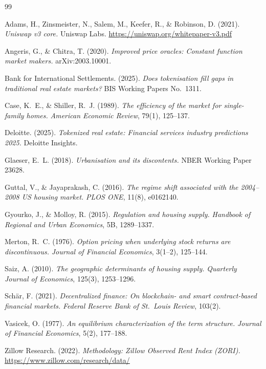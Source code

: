 \documentclass[11pt,letterpaper]{article}
\begin{document}
\begin{thebibliography}{99}

Adams, H., Zinsmeister, N., Salem, M., Keefer, R., \& Robinson, D. (2021).
\textit{Uniswap v3 core.}
Uniswap Labs.
\url{https://uniswap.org/whitepaper-v3.pdf}

Angeris, G., \& Chitra, T. (2020).
\textit{Improved price oracles: Constant function market makers.}
arXiv:2003.10001.

Bank for International Settlements. (2025).
\textit{Does tokenisation fill gaps in traditional real estate markets?}
BIS Working Papers No.\ 1311.

Case, K.~E., \& Shiller, R.~J. (1989).
\textit{The efficiency of the market for single-family homes.}
\textit{American Economic Review}, 79(1), 125--137.

Deloitte. (2025).
\textit{Tokenized real estate: Financial services industry predictions 2025.}
Deloitte Insights.

Glaeser, E.~L. (2018).
\textit{Urbanisation and its discontents.}
NBER Working Paper 23628.

Guttal, V., \& Jayaprakash, C. (2016).
\textit{The regime shift associated with the 2004--2008 US housing market.}
\textit{PLOS ONE}, 11(8), e0162140.

Gyourko, J., \& Molloy, R. (2015).
\textit{Regulation and housing supply.}
\textit{Handbook of Regional and Urban Economics}, 5B, 1289--1337.

Merton, R.~C. (1976).
\textit{Option pricing when underlying stock returns are discontinuous.}
\textit{Journal of Financial Economics}, 3(1--2), 125--144.

Saiz, A. (2010).
\textit{The geographic determinants of housing supply.}
\textit{Quarterly Journal of Economics}, 125(3), 1253--1296.

Sch\"{a}r, F. (2021).
\textit{Decentralized finance: On blockchain- and smart contract-based financial markets.}
\textit{Federal Reserve Bank of St.\ Louis Review}, 103(2).

Vasicek, O. (1977).
\textit{An equilibrium characterization of the term structure.}
\textit{Journal of Financial Economics}, 5(2), 177--188.

Zillow Research. (2022).
\textit{Methodology: Zillow Observed Rent Index (ZORI).}
\url{https://www.zillow.com/research/data/}

\end{thebibliography}
\end{document}
